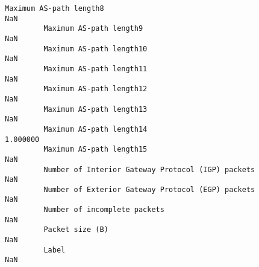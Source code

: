 \documentclass[11pt]{article}
\begin{document}
\begin{Verbatim}[commandchars=\\\{\}]
         Maximum AS-path length8                                                 NaN   
         Maximum AS-path length9                                                 NaN   
         Maximum AS-path length10                                                NaN   
         Maximum AS-path length11                                                NaN   
         Maximum AS-path length12                                                NaN   
         Maximum AS-path length13                                                NaN   
         Maximum AS-path length14                                           1.000000   
         Maximum AS-path length15                                                NaN   
         Number of Interior Gateway Protocol (IGP) packets                       NaN   
         Number of Exterior Gateway Protocol (EGP) packets                       NaN   
         Number of incomplete packets                                            NaN   
         Packet size (B)                                                         NaN   
         Label                                                                   NaN   
         

\end{Verbatim}
\end{document}
